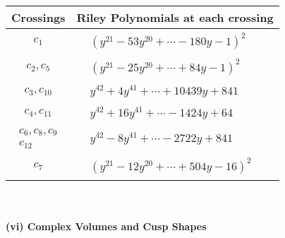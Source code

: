 \documentclass[1p]{elsarticle_modified}
\theoremstyle{definition}
\begin{document}
\begin{tabular}{m{50pt}|m{274pt}}
Crossings & \hspace{64pt}Riley Polynomials at each crossing \\
\hline $$\begin{aligned}c_{1}\end{aligned}$$&$\begin{aligned}
&(y^{21}-53 y^{20}+\cdots-180 y-1)^{2}
\end{aligned}$\\
\hline $$\begin{aligned}c_{2},c_{5}\end{aligned}$$&$\begin{aligned}
&(y^{21}-25 y^{20}+\cdots+84 y-1)^{2}
\end{aligned}$\\
\hline $$\begin{aligned}c_{3},c_{10}\end{aligned}$$&$\begin{aligned}
&y^{42}+4 y^{41}+\cdots+10439 y+841
\end{aligned}$\\
\hline $$\begin{aligned}c_{4},c_{11}\end{aligned}$$&$\begin{aligned}
&y^{42}+16 y^{41}+\cdots-1424 y+64
\end{aligned}$\\
\hline $$\begin{aligned}c_{6},c_{8},c_{9}\\c_{12}\end{aligned}$$&$\begin{aligned}
&y^{42}-8 y^{41}+\cdots-2722 y+841
\end{aligned}$\\
\hline $$\begin{aligned}c_{7}\end{aligned}$$&$\begin{aligned}
&(y^{21}-12 y^{20}+\cdots+504 y-16)^{2}
\end{aligned}$\\
\hline
\end{tabular}\\~\\
\newpage\flushleft \textbf{(vi) Complex Volumes and Cusp Shapes}
\end{document}
